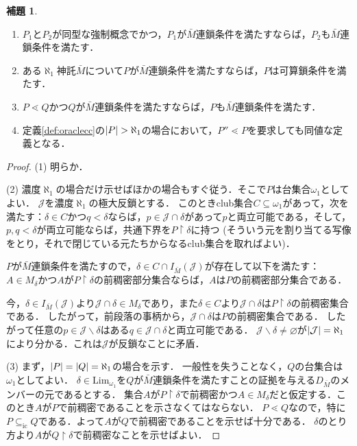 \documentclass[uplatex]{jsarticle}
\newcommand{\restrict}{\upharpoonright}
\newcommand{\Lim}{\mathrm{Lim}}
\newcommand{\subsetic}{\subseteq_{\mathrm{ic}}}
\DeclarePairedDelimiter\abs{\lvert}{\rvert}
\renewcommand\emptyset{\varnothing}
\renewcommand\subset{\subseteq}
\renewcommand{\setminus}{\smallsetminus}
\theoremstyle{definition}
\newtheorem{lem}[thm]{補題}
\begin{document}
	\begin{lem}\label{lem:propetiesoforaclecc}
		\begin{enumerate}
			\item $P_1$と$P_2$が同型な強制概念でかつ，$P_1$が$\bar{M}$連鎖条件を満たすならば，$P_2$も$\bar{M}$連鎖条件を満たす．
			\item ある$\aleph_1$神託$\bar{M}$について$P$が$\bar{M}$連鎖条件を満たすならば，$P$は可算鎖条件を満たす．
			\item $P \lessdot Q$かつ$Q$が$\bar{M}$連鎖条件を満たすならば，$P$も$\bar{M}$連鎖条件を満たす．
			\item 定義\ref{def:oraclecc}の$\abs{P} > \aleph_1$の場合において，$P'' \lessdot P$を要求しても同値な定義となる．
		\end{enumerate}
	\end{lem}
	\begin{proof}
		(1) 明らか．
		
		(2) 濃度$\aleph_1$の場合だけ示せばほかの場合もすぐ従う．そこで$P$は台集合$\omega_1$としてよい．
		$\mathcal{J}$を濃度$\aleph_1$の極大反鎖とする．
		このときclub集合$C \subset \omega_1$があって，次を満たす：$\delta \in C$かつ$q < \delta$ならば，$p \in \mathcal{J} \cap \delta$があって$p$と両立可能である，そして，$p, q < \delta$が両立可能ならば，共通下界を$P \restrict \delta$に持つ (そういう元を割り当てる写像をとり，それで閉じている元たちからなるclub集合を取ればよい)．
		
		$P$が$\bar{M}$連鎖条件を満たすので，$\delta \in C \cap I_{\bar{M}}(\mathcal{J})$が存在して以下を満たす：
		$A \in M_\delta$かつ$A$が$P \restrict \delta$の前稠密部分集合ならば，$A$は$P$の前稠密部分集合である．
		
		今，$\delta \in I_{\bar{M}}(\mathcal{J})$より$\mathcal{J} \cap \delta \in M_\delta$であり，また$\delta \in C$より$\mathcal{J} \cap \delta$は$P \restrict \delta$の前稠密集合である．
		したがって，前段落の事柄から，$\mathcal{J} \cap \delta$は$P$の前稠密集合である．
		したがって任意の$p \in \mathcal{J} \setminus \delta$はある$q \in \mathcal{J} \cap \delta$と両立可能である．
		$\mathcal{J} \setminus \delta \ne \emptyset$が$\abs{\mathcal{J}} = \aleph_1$により分かる．これは$\mathcal{J}$が反鎖なことに矛盾．
		
		(3) まず，$\abs{P} = \abs{Q} = \aleph_1$の場合を示す．
		一般性を失うことなく，$Q$の台集合は$\omega_1$としてよい．
		$\delta \in \Lim_{\omega_1}$を$Q$が$\bar{M}$連鎖条件を満たすことの証拠を与える$D_{\bar{M}}$のメンバーの元であるとする．
		集合$A$が$P \restrict \delta$で前稠密かつ$A \in M_\delta$だと仮定する．このとき$A$が$P$で前稠密であることを示さなくてはならない．
		$P \lessdot Q$なので，特に$P \subsetic Q$である．よって$A$が$Q$で前稠密であることを示せば十分である．
		$\delta$のとり方より$A$が$Q \restrict \delta$で前稠密なことを示せばよい．
		

\end{proof}
\end{document}
